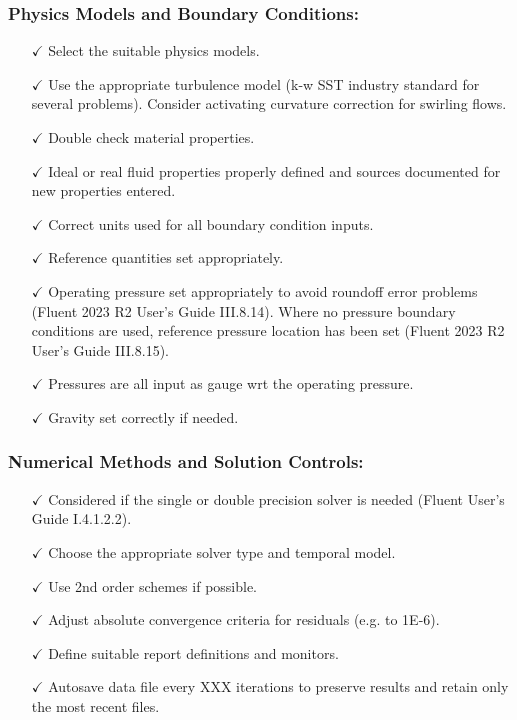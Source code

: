 \subsubsection*{Physics Models and Boundary Conditions:}
\begin{itemize}
    \item[$\checkmark$] Select the suitable physics models.
    \item[$\checkmark$] Use the appropriate turbulence model (k-w SST industry standard for several problems). Consider activating curvature correction for swirling flows.
    \item[$\checkmark$] Double check material properties.
    \item[$\checkmark$] Ideal or real fluid properties properly defined and sources documented for new properties entered.
    \item[$\checkmark$] Correct units used for all boundary condition inputs.
    \item[$\checkmark$] Reference quantities set appropriately.
    \item[$\checkmark$] Operating pressure set appropriately to avoid roundoff error problems (Fluent 2023 R2 User's Guide III.8.14). Where no pressure boundary conditions are used, reference pressure location has been set (Fluent 2023 R2 User's Guide III.8.15).
    \item[$\checkmark$] Pressures are all input as gauge wrt the operating pressure.
    \item[$\checkmark$] Gravity set correctly if needed.
\end{itemize}

\subsubsection*{Numerical Methods and Solution Controls:}
\begin{itemize}
    \item[$\checkmark$] Considered if the single or double precision solver is needed (Fluent User's Guide I.4.1.2.2).
    \item[$\checkmark$] Choose the appropriate solver type and temporal model.
    \item[$\checkmark$] Use 2nd order schemes if possible.
    \item[$\checkmark$] Adjust absolute convergence criteria for residuals (e.g. to 1E-6).
    \item[$\checkmark$] Define suitable report definitions and monitors.
    \item[$\checkmark$] Autosave data file every XXX iterations to preserve results and retain only the most recent files.
\end{itemize}

